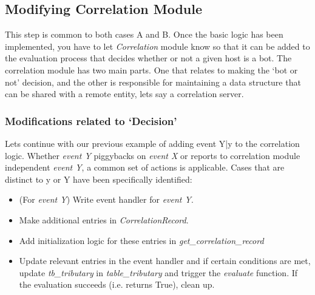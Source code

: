 \documentclass[acmtocl]{acmtrans2m}
\begin{document}
\subsection{Modifying Correlation Module}
This step is common to both cases A and B. Once the basic logic
has been implemented, you have to let \textit{Correlation} module know
so that it can be added to the evaluation process that decides
whether or not a given host is a bot.
The correlation module has two main parts. One that relates to 
making the `bot or not' decision, and the other is
responsible for maintaining a data structure that can 
be shared with a remote entity, lets say a correlation server.       

\subsubsection{Modifications related to `Decision'}
Lets continue with our previous example of adding event Y|y
to the correlation logic.
Whether \textit{event Y} piggybacks on
\textit{event X} or reports to correlation module independent
\textit{event Y}, a common set of actions is applicable. Cases
that are distinct to y or Y have been specifically identified:
\begin{itemize}
\item (For \textit{event Y}) Write event handler for \textit{event Y}.
\item Make additional entries in \textit{CorrelationRecord}.
\item Add initialization logic for these entries in  
\textit{get\_correlation\_record}
\item Update relevant entries in the event handler
and if certain conditions are met, update \textit{tb\_tributary} in
\textit{table\_tributary} and trigger the \textit{evaluate} function.
If the evaluation succeeds (i.e. returns True), clean up. 
\end{itemize}
\end{document}
